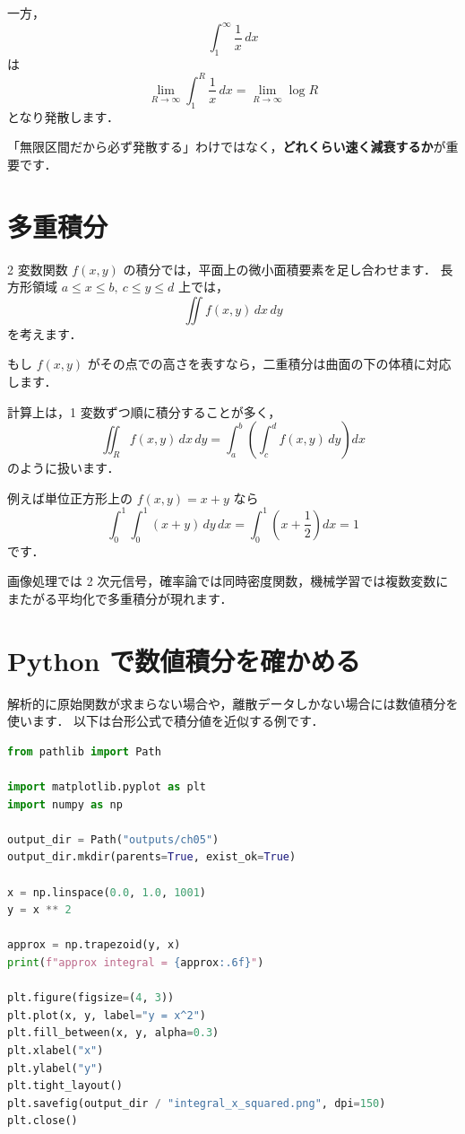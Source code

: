 一方，
\[
\int_1^\infty \frac{1}{x}\,dx
\]
は
\[
\lim_{R\to\infty}\int_1^R \frac{1}{x}\,dx
= \lim_{R\to\infty}\log R
\]
となり発散します．

「無限区間だから必ず発散する」わけではなく，\textbf{どれくらい速く減衰するか}が重要です．


\section{多重積分}

2 変数関数 $f(x,y)$ の積分では，平面上の微小面積要素を足し合わせます．
長方形領域 $a \leq x \leq b,\ c \leq y \leq d$ 上では，
\[
\iint f(x,y)\,dx\,dy
\]
を考えます．

もし $f(x,y)$ がその点での高さを表すなら，二重積分は曲面の下の体積に対応します．

計算上は，1 変数ずつ順に積分することが多く，
\[
\iint_R f(x,y)\,dx\,dy
= \int_a^b \left(\int_c^d f(x,y)\,dy\right)dx
\]
のように扱います．

例えば単位正方形上の $f(x,y)=x+y$ なら
\[
\int_0^1 \int_0^1 (x+y)\,dy\,dx
= \int_0^1 \left(x + \frac{1}{2}\right)dx
= 1
\]
です．

画像処理では 2 次元信号，確率論では同時密度関数，機械学習では複数変数にまたがる平均化で多重積分が現れます．


\section{Python で数値積分を確かめる}

解析的に原始関数が求まらない場合や，離散データしかない場合には数値積分を使います．
以下は台形公式で積分値を近似する例です．

\begin{lstlisting}[style=codecell,language=Python]
from pathlib import Path

import matplotlib.pyplot as plt
import numpy as np

output_dir = Path("outputs/ch05")
output_dir.mkdir(parents=True, exist_ok=True)

x = np.linspace(0.0, 1.0, 1001)
y = x ** 2

approx = np.trapezoid(y, x)
print(f"approx integral = {approx:.6f}")

plt.figure(figsize=(4, 3))
plt.plot(x, y, label="y = x^2")
plt.fill_between(x, y, alpha=0.3)
plt.xlabel("x")
plt.ylabel("y")
plt.tight_layout()
plt.savefig(output_dir / "integral_x_squared.png", dpi=150)
plt.close()
\end{lstlisting}

